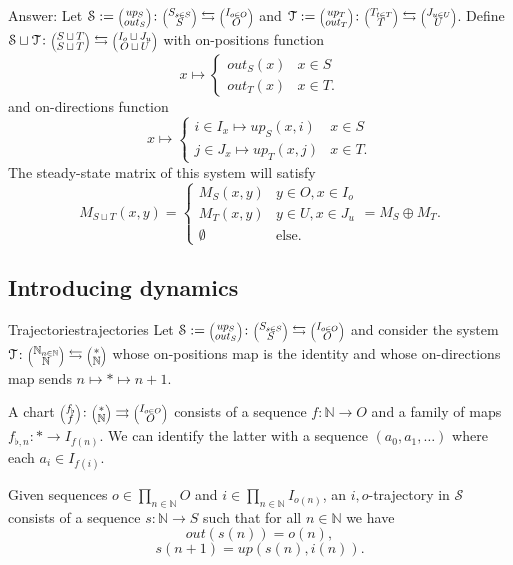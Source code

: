 \documentclass[12pt, a4paper]{article}
\theoremstyle{definition}
\theoremstyle{plain}
\theoremstyle{plain}
\theoremstyle{plain}
\theoremstyle{plain}
\theoremstyle{plain}
\theoremstyle{remark}
\theoremstyle{remark}
\newcommand{\mc}[1]{\mathcal{#1}}
\newcommand{\lens}[2]{\scaleobj{0.6}{\begin{pmatrix} \scaleobj{1.3}{{#1}} \\ \scaleobj{1.3}{{#2}} \end{pmatrix}}}
\begin{document}
Answer: Let $\mc{S} := \lens{up_S}{out_S} \colon \lens{S_{s \in S}}{S} \leftrightarrows \lens{I_{o \in O}}{O}$ and $\mc{T} := \lens{up_T}{out_T} \colon \lens{T_{t \in T}}{T} \leftrightarrows \lens{J_{u \in U}}{U}$. Define $\mc{S} \sqcup \mc{T} \colon \lens{S \sqcup T}{S \sqcup T} \leftrightarrows \lens{I_o \sqcup J_u}{O \sqcup U}$ with on-positions function 
$$x \mapsto \begin{cases} out_S(x) & x \in S \\ out_T(x) & x \in T. \end{cases}$$ 
and on-directions function 
$$ x \mapsto \begin{cases} i \in I_x \mapsto up_S(x,i) & x \in S \\ j \in J_x \mapsto up_T(x,j) & x \in T. \end{cases}$$
The steady-state matrix of this system will satisfy 
$$M_{S \sqcup T}(x,y) = \begin{cases} M_S(x,y) & y \in O, x \in I_o \\  M_T(x,y) & y \in U, x \in J_u \\ \emptyset & \text{else.} \end{cases} = M_S \oplus M_T.$$

\subsection{Introducing dynamics}

\begin{tcdefinition}{Trajectories}{trajectories}
	Let $\mc{S} := \lens{up_S}{out_S} \colon \lens{S_{s \in S}}{S} \leftrightarrows \lens{I_{o \in O}}{O}$ and consider the system $\mc{T} \colon \lens{\mathbb{N}_{n \in \mathbb{N}}}{\mathbb{N}} \leftrightarrows \lens{*}{\mathbb{N}}$ whose on-positions map is the identity and whose on-directions map sends $n \mapsto * \mapsto n+1$.

	A chart $\lens{f_\flat}{f} \colon \lens{*}{\mathbb{N}} \rightrightarrows \lens{I_{o \in O}}{O}$ consists of a sequence $f \colon \mathbb{N} \rightarrow O$ and a family of maps $f_{\flat,n} \colon * \rightarrow I_{f(n)}$. We can identify the latter with a sequence $(a_0, a_1, \ldots)$ where each $a_i \in I_{f(i)}$.

	Given sequences $o \in \prod_{n \in \mathbb{N}} O$ and $i \in \prod_{n \in \mathbb{N}} I_{o(n)}$, an $i,o$-trajectory in $\mc{S}$ consists of a sequence $s \colon \mathbb{N} \rightarrow S$ such that for all $n \in \mathbb{N}$ we have
	$$out(s(n)) = o(n), $$
	$$s(n+1) = up(s(n), i(n)).$$
\end{tcdefinition}
\end{document}
